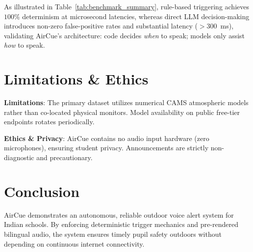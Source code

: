 \documentclass[conference]{IEEEtran}
\begin{document}
As illustrated in Table~\ref{tab:benchmark_summary}, rule-based triggering achieves $100\%$ determinism at microsecond latencies, whereas direct LLM decision-making introduces non-zero false-positive rates and substantial latency ($>300$~ms), validating AirCue's architecture: code decides \textit{when} to speak; models only assist \textit{how} to speak.

\section{Limitations \& Ethics}
\textbf{Limitations}: The primary dataset utilizes numerical CAMS atmospheric models rather than co-located physical monitors. Model availability on public free-tier endpoints rotates periodically.

\textbf{Ethics \& Privacy}: AirCue contains no audio input hardware (zero microphones), ensuring student privacy. Announcements are strictly non-diagnostic and precautionary.

\section{Conclusion}
AirCue demonstrates an autonomous, reliable outdoor voice alert system for Indian schools. By enforcing deterministic trigger mechanics and pre-rendered bilingual audio, the system ensures timely pupil safety outdoors without depending on continuous internet connectivity.



\end{document}
